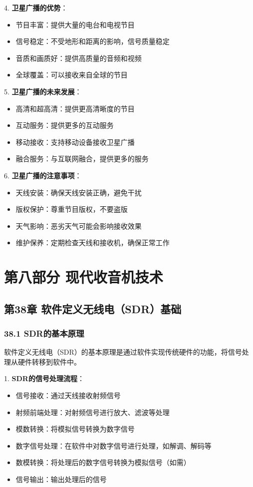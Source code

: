 \documentclass[12pt,UTF8]{ctexbook}
\begin{document}
4. \textbf{卫星广播的优势}：
   \begin{itemize}[leftmargin=3.5em]
   \item 节目丰富：提供大量的电台和电视节目
   \item 信号稳定：不受地形和距离的影响，信号质量稳定
   \item 音质和画质好：提供高质量的音频和视频
   \item 全球覆盖：可以接收来自全球的节目
   \end{itemize}

5. \textbf{卫星广播的未来发展}：
   \begin{itemize}[leftmargin=3.5em]
   \item 高清和超高清：提供更高清晰度的节目
   \item 互动服务：提供更多的互动服务
   \item 移动接收：支持移动设备接收卫星广播
   \item 融合服务：与互联网融合，提供更多的服务
   \end{itemize}

6. \textbf{卫星广播的注意事项}：
   \begin{itemize}[leftmargin=3.5em]
   \item 天线安装：确保天线安装正确，避免干扰
   \item 版权保护：尊重节目版权，不要盗版
   \item 天气影响：恶劣天气可能会影响接收效果
   \item 维护保养：定期检查天线和接收机，确保正常工作
   \end{itemize}

\part*{第八部分 现代收音机技术}

\chapter*{第38章 软件定义无线电（SDR）基础}
\section*{38.1 SDR的基本原理}

软件定义无线电（SDR）的基本原理是通过软件实现传统硬件的功能，将信号处理从硬件转移到软件中。

1. \textbf{SDR的信号处理流程}：
   \begin{itemize}[leftmargin=3.5em]
   \item 信号接收：通过天线接收射频信号
   \item 射频前端处理：对射频信号进行放大、滤波等处理
   \item 模数转换：将模拟信号转换为数字信号
   \item 数字信号处理：在软件中对数字信号进行处理，如解调、解码等
   \item 数模转换：将处理后的数字信号转换为模拟信号（如需）
   \item 信号输出：输出处理后的信号
   \end{itemize}
\end{document}
